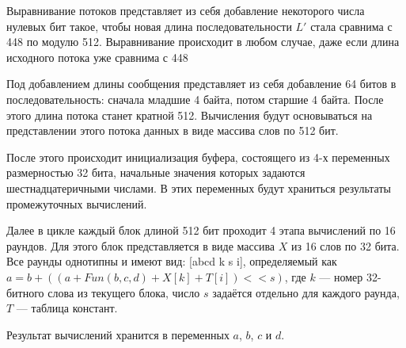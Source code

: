 Выравнивание потоков представляет из себя добавление некоторого числа нулевых бит такое, чтобы новая длина последовательности $L'$ стала сравнима с 448 по модулю 512. Выравнивание происходит в любом случае, даже если длина исходного потока уже сравнима с 448

Под добавлением длины сообщения представляет из себя добавление 64 битов в последовательность: сначала младшие 4 байта, потом старшие 4 байта. После этого длина потока станет кратной 512. Вычисления будут основываться на представлении этого потока данных в виде массива слов по 512 бит.

После этого происходит инициализация буфера, состоящего из 4-х переменных размерностью 32 бита, начальные значения которых задаются шестнадцатеричными числами.
В этих переменных будут храниться результаты промежуточных вычислений.

Далее в цикле каждый блок длиной 512 бит проходит 4 этапа вычислений по 16 раундов. Для этого блок представляется в виде массива $X$ из 16 слов по 32 бита.
Все раунды однотипны и имеют вид: [abcd k s i], определяемый как $a = b + ((a +Fun(b, c,d) + X[k] + T[i]	) << s)$, где $k$ --- номер 32-битного слова из текущего блока, число $s$ задаётся отдельно для каждого раунда, $T$ --- таблица констант.

Результат вычислений хранится в переменных  $a$, $b$, $c$ и $d$.
